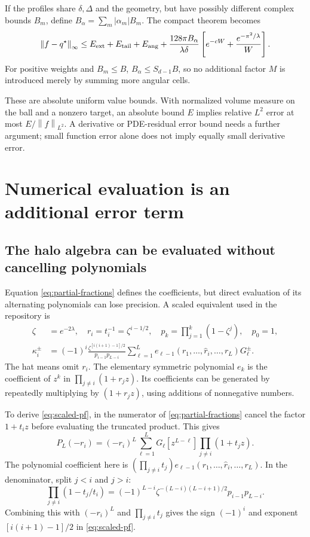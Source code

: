 \documentclass[11pt]{article}
\newcommand{\norm}[1]{\left\lVert#1\right\rVert}
\begin{document}
If the profiles share $\delta,\Delta$ and the geometry, but have possibly different complex bounds $B_m$, define $B_\alpha=\sum_m|\alpha_m|B_m$. The compact theorem becomes
\begin{equation}
 \norm{f-q^\star}_\infty\le E_{\rm ext}+E_{\rm tail}+E_{\rm ang}
 +\frac{128\pi B_\alpha}{\lambda\delta}
 \left[e^{-cW}+\frac{e^{-\pi^2/\lambda}}W\right].
 \label{eq:total-compact}
\end{equation}
For positive weights and $B_m\le B$, $B_\alpha\le S_{d-1}B$, so no additional factor $M$ is introduced merely by summing more angular cells.

These are absolute uniform value bounds. With normalized volume measure on the ball and a nonzero target, an absolute bound $E$ implies relative $L^2$ error at most $E/\norm{f}_{L^2}$. A derivative or PDE-residual error bound needs a further argument; small function error alone does not imply equally small derivative error.

\section{Numerical evaluation is an additional error term}
\subsection{The halo algebra can be evaluated without cancelling polynomials}

Equation \eqref{eq:partial-fractions} defines the coefficients, but direct evaluation of its alternating polynomials can lose precision. A scaled equivalent used in the repository is
\begin{align}
 \zeta&=e^{-2\lambda},\quad r_i=t_i^{-1}=\zeta^{i-1/2},\quad
 p_k=\prod_{j=1}^k(1-\zeta^j),\quad p_0=1,\\
 \kappa_i^\pm&=(-1)^i
 \frac{\zeta^{[i(i+1)-1]/2}}{p_{i-1}p_{L-i}}
 \sum_{\ell=1}^L
 e_{\ell-1}(r_1,\ldots,\widehat r_i,\ldots,r_L)G_\ell^\pm.
 \label{eq:scaled-pf}
\end{align}
The hat means omit $r_i$. The elementary symmetric polynomial $e_k$ is the coefficient of $z^k$ in $\prod_{j\ne i}(1+r_jz)$. Its coefficients can be generated by repeatedly multiplying by $(1+r_jz)$, using additions of nonnegative numbers.

To derive \eqref{eq:scaled-pf}, in the numerator of \eqref{eq:partial-fractions} cancel the factor $1+t_i z$ before evaluating the truncated product. This gives
\[
 P_L(-r_i)=(-r_i)^L\sum_{\ell=1}^L
 G_\ell[z^{L-\ell}]\prod_{j\ne i}(1+t_jz).
\]
The polynomial coefficient here is
$(\prod_{j\ne i}t_j)e_{\ell-1}(r_1,\ldots,\widehat r_i,\ldots,r_L)$.
In the denominator, split $j<i$ and $j>i$:
\[
 \prod_{j\ne i}(1-t_j/t_i)
 =(-1)^{L-i}\zeta^{-(L-i)(L-i+1)/2}p_{i-1}p_{L-i}.
\]
Combining this with $(-r_i)^L$ and $\prod_{j\ne i}t_j$ gives the sign $(-1)^i$ and exponent $[i(i+1)-1]/2$ in \eqref{eq:scaled-pf}.
\end{document}
